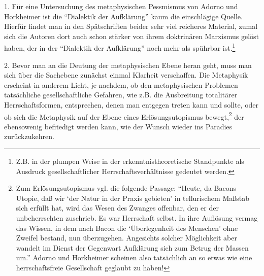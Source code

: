 \documentclass[12pt,a4paper,ngerman]{article}
\begin{document}
1. Für eine Untersuchung des metaphysischen Pessmismus von Adorno und
Horkheimer ist die "`Dialektik der Aufklärung"' kaum die einschlägige Quelle.
Hierfür findet man in den Spätschriften beider sehr viel reicheres Material,
zumal sich die Autoren dort auch schon stärker von ihrem doktrinären Marxismus
gelöst haben, der in der "`Dialektik der Aufklärung"' noch mehr als spührbar
ist.\footnote{Z.B. in der plumpen Weise in der erkenntnistheoretische
  Standpunkte als Ausdruck gesellschaftlicher Herrschaftsverhältnisse gedeutet
  werden.}

2. Bevor man an die Deutung der metaphysischen Ebene heran geht, muss man sich
über die Sachebene zunächst einmal Klarheit verschaffen. Die Metaphysik
erscheint in anderem Licht, je nachdem, ob den metaphysischen Problemen
tatsächliche gesellschaftliche Gefahren, wie z.B. die Ausbreitung totalitärer
Herrschaftsformen, entsprechen, denen man entgegen treten kann und sollte,
oder ob sich die Metaphysik auf der Ebene eines Erlösungsutopismus
bewegt,\footnote{Zum Erlösungsutopismus vgl. die folgende Passage: "`Heute, da
  Bacons Utopie, daß wir `der Natur in der Praxis gebieten' in tellurischem
  Maßstab sich erfüllt hat, wird das Wesen des Zwanges offenbar, den er der
  unbeherrschten zuschrieb. Es war Herrschaft selbst. In ihre Auflösung vermag
  das Wissen, in dem nach Bacon die `Überlegenheit des Menschen' ohne Zweifel
  bestand, nun überzugehen. Angesichts solcher Möglichkeit aber wandelt im
  Dienst der Gegenwart Aufklärung sich zum Betrug der Massen um."' \cite [S.
  49]{adorno-horkheimer:1947} Adorno und Horkheimer scheinen also tatsächlich
  an so etwas wie eine herrschaftsfreie Gesellschaft geglaubt zu haben!}  der
ebensowenig befriedigt werden kann, wie der Wunsch wieder ins Paradies
zurückzukehren.
\end{document}
